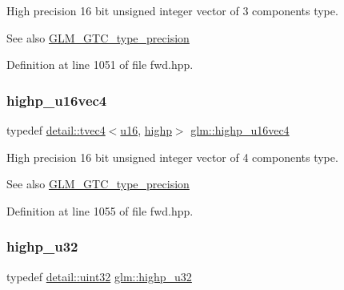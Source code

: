 High precision 16 bit unsigned integer vector of 3 components type. \begin{DoxySeeAlso}{See also}
\hyperlink{group__gtc__type__precision}{G\+L\+M\+\_\+\+G\+T\+C\+\_\+type\+\_\+precision} 
\end{DoxySeeAlso}


Definition at line 1051 of file fwd.\+hpp.

\mbox{\label{group__gtc__type__precision_ga89074b108ec0643cffdfd008bedd3ffb}} 
\subsubsection{\texorpdfstring{highp\+\_\+u16vec4}{highp\_u16vec4}}
{\footnotesize\ttfamily typedef \hyperlink{structglm_1_1detail_1_1tvec4}{detail\+::tvec4}$<$\hyperlink{group__gtc__type__precision_gae7a1571503f83d2264ddfa705a6b082a}{u16}, \hyperlink{namespaceglm_a0f04f086094c747d227af4425893f545ac6f7eab42eacbb10d59a58e95e362074}{highp}$>$ \hyperlink{group__gtc__type__precision_ga89074b108ec0643cffdfd008bedd3ffb}{glm\+::highp\+\_\+u16vec4}}

High precision 16 bit unsigned integer vector of 4 components type. \begin{DoxySeeAlso}{See also}
\hyperlink{group__gtc__type__precision}{G\+L\+M\+\_\+\+G\+T\+C\+\_\+type\+\_\+precision} 
\end{DoxySeeAlso}


Definition at line 1055 of file fwd.\+hpp.

\mbox{\label{group__gtc__type__precision_gae8e8a2c712653891a03c171795286ac5}} 
\subsubsection{\texorpdfstring{highp\+\_\+u32}{highp\_u32}}
{\footnotesize\ttfamily typedef \hyperlink{namespaceglm_1_1detail_ade6cfbf377022aaa391af8cd50489222}{detail\+::uint32} \hyperlink{group__gtc__type__precision_gae8e8a2c712653891a03c171795286ac5}{glm\+::highp\+\_\+u32}}


